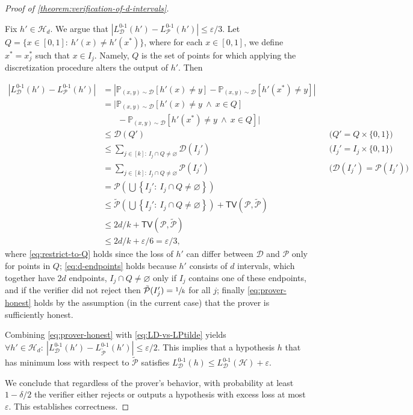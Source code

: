 \documentclass[11pt]{article}
\numberwithin{equation}{section}
\theoremstyle{definition}
\theoremstyle{plain}
\theoremstyle{definition}\newtheorem{notation}[theorem]{Notation}\theoremstyle{plain}\raggedbottom
\newcommand{\roundBrackets}[1]{
	\mathopen{}\left(#1\right)\mathclose{}
}
\newcommand{\squareBrackets}[1]{
	\mathopen{}\left[#1\right]\mathclose{}
}
\newcommand{\customFunctionRound}[2]{
	#1\roundBrackets{#2}
}
\newcommand{\customFunctionSquare}[2]{
	#1\squareBrackets{#2}
}
\newcommand{\sfFunction}[2]{
	\customFunctionRound{\mathsf{#1}}{#2}
}
\newcommand{\tagexplain}[1]{&& \text{(#1)}}
\newcommand{\PPP}[2]{\customFunctionSquare{\mathbb{P}_{#1}}{#2}}
\newcommand{\LossIndicator}[2]{\LossIndicatorNameEmpty_{#1}\roundBrackets{#2}}
\newcommand{\LossIndicatorNameEmpty}{L^{0\text{-}1}}
\newcommand{\TV}[1]{\sfFunction{TV}{#1}}
\newcommand{\cD}{\mathcal{D}}
\newcommand{\cH}{\mathcal{H}}
\newcommand{\cP}{\mathcal{P}}
\newcommand{\1}{\mathds{1}}
\begin{document}
\begin{proof}[Proof of \cref{theorem:verification-of-d-intervals}]
\begin{itemize}
{			Fix $h' \in \cH_d$. We argue that $\left|\LossIndicator{\cD}{h'} - \LossIndicator{\cP}{h'}\right| \leq \varepsilon/3$. 
			Let $Q = \{x \in [0,1]: ~ h'(x) \neq h'(x^*) \}$, where for each $x \in [0,1]$, we define $x^* = x_j^*$ such that $x \in I_j$. Namely, $Q$ is the set of points for which applying the discretization procedure alters the output of $h'$. Then

			\begingroup
			\allowdisplaybreaks
			\begin{align}
				\left|\LossIndicator{\cD}{h'}-\LossIndicator{\cP}{h'}\right| &= \left|\PPP{(x,y) \sim \cD}{h'(x) \neq y}-\PPP{(x,y) \sim \cD}{h'(x^*) \neq y}\right| \nonumber\\
				&= \Big|\PPP{(x,y) \sim \cD}{h'(x) \neq y ~ \land ~ x \in Q} \nonumber\\
				& ~~~~~~~~ -\PPP{(x,y) \sim \cD}{h'(x^*) \neq y  ~ \land ~ x \in Q}\Big| \label{eq:restrict-to-Q}\\
				&\leq \cD(Q') \tagexplain{$Q' = Q \times \{0,1\}$}\nonumber\\
				&\leq \sum_{j \in [k]: ~ I_j \cap Q \neq \varnothing} \cD(I_j') \tagexplain{$I_j' = I_j \times \{0,1\}$} \nonumber\\
				&= \sum_{j \in [k]: ~ I_j \cap Q \neq \varnothing} \cP(I_j') \tagexplain{$\cD(I_j')=\cP(I_j')$}\nonumber\\
				&=\cP\left(\bigcup\left\{I_j': ~ I_j \cap Q \neq \varnothing\right\}\right) \nonumber\\
				&\leq \tilde{\cP}\left(\bigcup\left\{I_j': ~ I_j \cap Q \neq \varnothing\right\}\right) + \TV{\cP,\tilde{\cP}} \nonumber\\
				&\leq 2d/k + \TV{\cP,\tilde{\cP}} \label{eq:d-endpoints}\\
				&\leq 2d/k + \varepsilon/6 = \varepsilon/3, \label{eq:prover-honest}
			\end{align}%
			\endgroup
			where \cref{eq:restrict-to-Q} holds since the loss of $h'$ can differ between $\cD$ and $\cP$ only for points in $Q$; \cref{eq:d-endpoints} holds because $h'$ consists of $d$ intervals, which together have $2d$ endpoints, $I_j \cap Q \neq \varnothing$ only if $I_j$ contains one of these endpoints, and if the verifier did not reject then $\tilde{\cP}(I_j') = \sfrac{1}{k}$ for all $j$; finally \cref{eq:prover-honest} holds by the assumption (in the current case) that the prover is sufficiently honest.

			Combining \cref{eq:prover-honest} with \cref{eq:LD-vs-LPtilde} yields $\forall h' \in \cH_d: ~ \left|\LossIndicator{\cD}{h'} - \LossIndicator{\tilde{\cP}}{h'}\right| \leq \varepsilon/2$. This implies that a hypothesis $h$ that has minimum loss with respect to $\tilde{\cP}$ satisfies $\LossIndicator{\cD}{h} \leq \LossIndicator{\cD}{\cH} + \varepsilon$. 
		}
	\end{itemize}
	We conclude that regardless of the prover's behavior, with probability at least $1-\delta/2$ the verifier either rejects or outputs a hypothesis with excess loss at most $\varepsilon$. This establishes correctness.


\end{proof}
\end{document}

